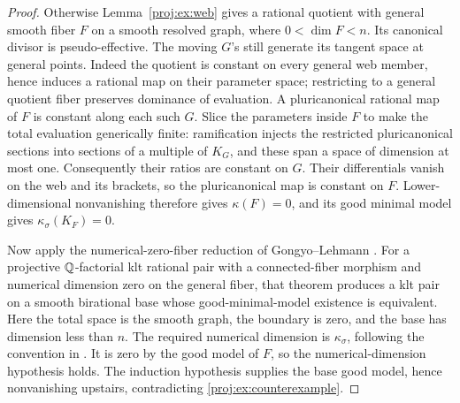 \begin{proof}
Otherwise Lemma~\ref{proj:ex:web} gives a rational quotient with general
smooth fiber \(F\) on a smooth resolved graph, where
\(0<\dim F<n\). Its canonical divisor is pseudo-effective.
The moving \(G\)'s still generate its tangent space at general
points. Indeed the quotient is constant on every general web
member, hence induces a rational map on their parameter space;
restricting to a general quotient fiber preserves dominance of
evaluation. A pluricanonical rational map of \(F\) is constant
along each such \(G\). Slice the parameters inside \(F\) to make
the total evaluation generically finite: ramification injects the
restricted pluricanonical sections into sections of a multiple of
\(K_G\), and these span a space of dimension at most one.
Consequently their ratios are constant on \(G\). Their
differentials vanish on the web and its brackets, so the
pluricanonical map is constant on \(F\). Lower-dimensional
nonvanishing therefore gives \(\kappa(F)=0\), and its good minimal
model gives \(\kappa_\sigma(K_F)=0\).

Now apply the numerical-zero-fiber reduction of
Gongyo--Lehmann \cite[Theorem~1.3 and Corollary~4.5]{Proj-GongyoLehmann2013}.
For a projective \(\mathbb{Q}\)-factorial klt rational pair with a
connected-fiber morphism and numerical dimension zero on the
general fiber, that theorem produces a klt pair on a smooth
birational base whose good-minimal-model existence is equivalent.
Here the total space is the smooth graph, the boundary is zero,
and the base has dimension less than \(n\). The required numerical
dimension is \(\kappa_\sigma\), following the convention in
\cite[Section~3 and Theorem~3.2]{Proj-Fujino2019Numerical}. It is
zero by the good model of \(F\), so the numerical-dimension
hypothesis holds. The induction hypothesis supplies the base good
model, hence nonvanishing upstairs, contradicting
\eqref{proj:ex:counterexample}.
\end{proof}

